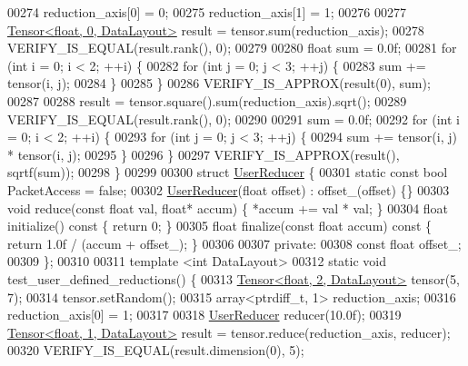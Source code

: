 \begin{DoxyCode}
00274   reduction\_axis[0] = 0;
00275   reduction\_axis[1] = 1;
00276 
00277   \hyperlink{class_eigen_1_1_tensor}{Tensor<float, 0, DataLayout>} result = tensor.sum(reduction\_axis);
00278   VERIFY\_IS\_EQUAL(result.rank(), 0);
00279 
00280   \textcolor{keywordtype}{float} sum = 0.0f;
00281   \textcolor{keywordflow}{for} (\textcolor{keywordtype}{int} i = 0; i < 2; ++i) \{
00282     \textcolor{keywordflow}{for} (\textcolor{keywordtype}{int} j = 0; j < 3; ++j) \{
00283       sum += tensor(i, j);
00284     \}
00285   \}
00286   VERIFY\_IS\_APPROX(result(0), sum);
00287 
00288   result = tensor.square().sum(reduction\_axis).sqrt();
00289   VERIFY\_IS\_EQUAL(result.rank(), 0);
00290 
00291   sum = 0.0f;
00292   \textcolor{keywordflow}{for} (\textcolor{keywordtype}{int} i = 0; i < 2; ++i) \{
00293     \textcolor{keywordflow}{for} (\textcolor{keywordtype}{int} j = 0; j < 3; ++j) \{
00294       sum += tensor(i, j) * tensor(i, j);
00295     \}
00296   \}
00297   VERIFY\_IS\_APPROX(result(), sqrtf(sum));
00298 \}
00299 
00300 \textcolor{keyword}{struct }\hyperlink{struct_user_reducer}{UserReducer} \{
00301   \textcolor{keyword}{static} \textcolor{keyword}{const} \textcolor{keywordtype}{bool} PacketAccess = \textcolor{keyword}{false};
00302   \hyperlink{struct_user_reducer}{UserReducer}(\textcolor{keywordtype}{float} offset) : offset\_(offset) \{\}
00303   \textcolor{keywordtype}{void} reduce(\textcolor{keyword}{const} \textcolor{keywordtype}{float} val, \textcolor{keywordtype}{float}* accum) \{ *accum += val * val; \}
00304   \textcolor{keywordtype}{float} initialize()\textcolor{keyword}{ const }\{ \textcolor{keywordflow}{return} 0; \}
00305   \textcolor{keywordtype}{float} finalize(\textcolor{keyword}{const} \textcolor{keywordtype}{float} accum)\textcolor{keyword}{ const }\{ \textcolor{keywordflow}{return} 1.0f / (accum + offset\_); \}
00306 
00307  \textcolor{keyword}{private}:
00308   \textcolor{keyword}{const} \textcolor{keywordtype}{float} offset\_;
00309 \};
00310 
00311 \textcolor{keyword}{template} <\textcolor{keywordtype}{int} DataLayout>
00312 \textcolor{keyword}{static} \textcolor{keywordtype}{void} test\_user\_defined\_reductions() \{
00313   \hyperlink{class_eigen_1_1_tensor}{Tensor<float, 2, DataLayout>} tensor(5, 7);
00314   tensor.setRandom();
00315   array<ptrdiff\_t, 1> reduction\_axis;
00316   reduction\_axis[0] = 1;
00317 
00318   \hyperlink{struct_user_reducer}{UserReducer} reducer(10.0f);
00319   \hyperlink{class_eigen_1_1_tensor}{Tensor<float, 1, DataLayout>} result = tensor.reduce(reduction\_axis, reducer);
00320   VERIFY\_IS\_EQUAL(result.dimension(0), 5);

\end{DoxyCode}

